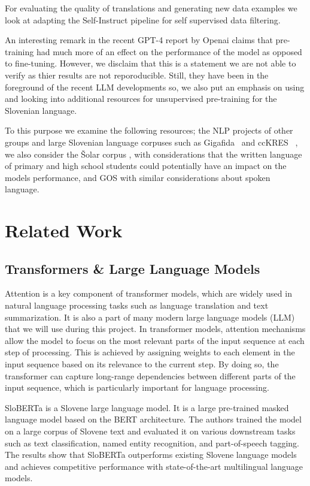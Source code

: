 \documentclass[fleqn,moreauthors,10pt]{ds_report}
\begin{document}
    For evaluating the quality of translations and generating new data examples we look at adapting the Self-Instruct \cite{wang2022selfinstruct} pipeline for self supervised data filtering.
    
    An interesting remark in the recent GPT-4 report by Openai claims that pre-training had much more of an effect on the performance of the model as opposed to fine-tuning. However, we disclaim that this is a statement we are not able to verify as thier results are not reporoducible. 
    Still, they have been in the foreground of the recent LLM developments so, we also put an emphasis on using and looking into additional resources for unsupervised pre-training for the Slovenian language. 

    To this purpose we examine the following resources; the NLP projects of other groups and large Slovenian language corpuses such as Gigafida~\cite{11356/1320} and ccKRES~\cite{ccKres} , we also consider the Šolar corpus \cite{kosem2011slovenian}, with considerations that the written language of primary and high school students could potentially have an impact on the models performance, and GOS \cite{Verdonik2013} with similar considerations about spoken language.

    
\section*{Related Work}

\subsection*{Transformers \& Large Language Models}
Attention \cite{vaswani2017attention} is a key component of transformer models, which are widely used in natural language processing tasks such as language translation and text summarization.
It is also a part of many modern large language models (LLM) that we will use during this project.
In transformer models, attention mechanisms allow the model to focus on the most relevant parts of the input sequence at each step of processing.
This is achieved by assigning weights to each element in the input sequence based on its relevance to the current step.
By doing so, the transformer can capture long-range dependencies between different parts of the input sequence, which is particularly important for language processing.

SloBERTa \cite{ulvcar2021sloberta} is a Slovene large language model. It is a large pre-trained masked language model based on the BERT architecture. The authors trained the model on a large corpus of Slovene text and evaluated it on various downstream tasks such as text classification, named entity recognition, and part-of-speech tagging. The results show that SloBERTa outperforms existing Slovene language models and achieves competitive performance with state-of-the-art multilingual language models. 
\end{document}
